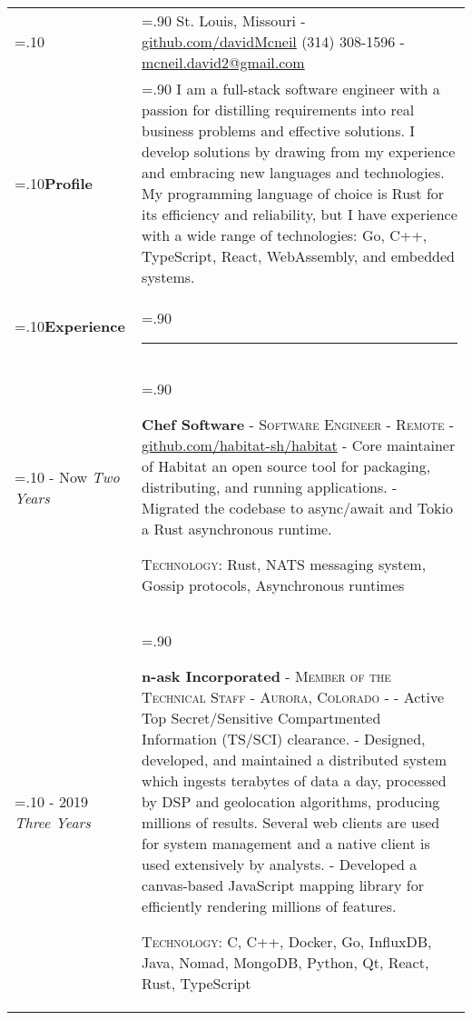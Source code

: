 \documentclass[10pt]{article}
\newcommand{\timeFrame}[3] {
  \if\relax\detokenize{#2}\relax
    #1
  \else
    #1 - #2
  \fi
  \newline
  \scriptsize \textit{#3}
}
\newcommand{\entry}[6] {
  \textbf{#1}
  \if\relax\detokenize{#2}\relax
  \else
       - \textsc{#2}
  \fi
  \if\relax\detokenize{#3}\relax
  \else
      - \textsc{#3}
  \fi
  \if\relax\detokenize{#4}\relax
  \else
      - \href{https://#4}{#4}
  \fi
  \newline #5
  \if\relax\detokenize{#6}\relax
  \else
      \newline \textsc{Technology:} #6
  \fi
  \\
}
\newcommand{\horizontalLine}[0] {
    \noindent\rule{.90\linewidth}{0.4pt}
}
\begin{document}

\begin{tabularx}{\linewidth}{>{\hsize=.10\hsize}X>{\hsize=.90\hsize}X}

{\bfseries\large David McNeil} &
St. Louis, Missouri - \href{https://github.com/davidMcneil}{github.com/davidMcneil}\newline
{(314) 308-1596 \hspace{5.5mm} - \href{mailto:mcneil.david2@gmail.com}{mcneil.david2@gmail.com}} \\[5pt]

\textbf{Profile} &
{I am a full-stack software engineer with a passion for distilling requirements into real business problems and effective solutions. I develop solutions by drawing from my experience and embracing new languages and technologies. My programming language of choice is Rust for its efficiency and reliability, but I have experience with a wide range of technologies: Go, C++, TypeScript, React, WebAssembly, and embedded systems.
} \\

\textbf{Experience} & \horizontalLine \\

\timeFrame{2019}{Now}{Two Years} &
\entry{Chef Software}
  {Software Engineer}
  {Remote}
  {github.com/habitat-sh/habitat}
  {
  - Core maintainer of Habitat an open source tool for packaging, distributing, and running applications. \newline
  - Migrated the codebase to async/await and Tokio a Rust asynchronous runtime.
  }
  {Rust, NATS messaging system, Gossip protocols, Asynchronous runtimes}

\timeFrame{2016}{2019}{Three Years} &
\entry{n-ask Incorporated}
  {Member of the Technical Staff}
  {Aurora, Colorado}
  {}
  {
  - Active Top Secret/Sensitive Compartmented Information (TS/SCI) clearance. \newline
  - Designed, developed, and maintained a distributed system which ingests terabytes of data a day, processed by DSP and geolocation algorithms, producing millions of results. Several web clients are used for system management and a native client is used extensively by analysts. \newline
  - Developed a canvas-based JavaScript mapping library for efficiently rendering millions of features.
  }
  {C, C++, Docker, Go, InfluxDB, Java, Nomad, MongoDB, Python, Qt, React, Rust, TypeScript}


\end{tabularx}
\end{document}
